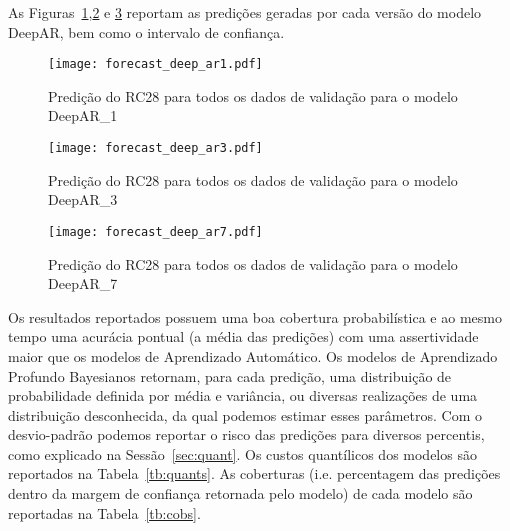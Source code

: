 As Figuras~\ref{fig:fordeepar1},\ref{fig:fordeepar3} e \ref{fig:fordeepar7} reportam as
predições geradas por cada versão do modelo DeepAR, bem como o intervalo de confiança. 

\begin{figure}[H]
  \centering
  \texttt{[image: forecast\_deep\_ar1.pdf]} 
  \caption{Predição do RC28 para todos os dados de validação para o modelo DeepAR\_1}
  \label{fig:fordeepar1}
\end{figure}

\begin{figure}[H]
  \centering
  \texttt{[image: forecast\_deep\_ar3.pdf]} 
  \caption{Predição do RC28 para todos os dados de validação para o modelo DeepAR\_3}
  \label{fig:fordeepar3}
\end{figure}

\begin{figure}[H]
  \centering
  \texttt{[image: forecast\_deep\_ar7.pdf]} 
  \caption{Predição do RC28 para todos os dados de validação para o modelo DeepAR\_7}
  \label{fig:fordeepar7}
\end{figure}


Os resultados reportados possuem uma boa cobertura probabilística e ao mesmo
tempo uma acurácia pontual (a média das predições) com uma assertividade maior
que os modelos de Aprendizado Automático. Os modelos de Aprendizado Profundo Bayesianos retornam, para cada predição, uma distribuição de
probabilidade definida por média e variância, ou diversas realizações de uma
distribuição desconhecida, da qual podemos estimar esses parâmetros. 
Com o desvio-padrão podemos reportar o risco das predições para diversos percentis, como explicado na
Sessão~\ref{sec:quant}. Os custos quantílicos dos modelos são reportados na
Tabela~\ref{tb:quants}. As coberturas (i.e. percentagem das predições dentro da
margem de confiança retornada pelo modelo) de cada modelo são reportadas na Tabela~\ref{tb:cobs}.


